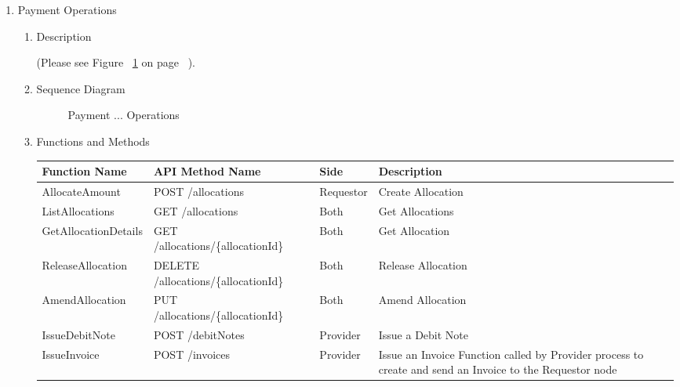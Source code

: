 

\begin{enumerate}

\item  Payment Operations

\begin{enumerate}

\item Description

(Please see Figure ~\ref{fig:PO} on page ~\pageref{fig:PO}).

\item Sequence Diagram

\begin{figure}[htbp]
    \centering
	\caption{Payment ... Operations}
    \label{fig:PO}
\end{figure}

\item Functions and Methods

\begin{table}
\footnotesize

\begin{center}
\begin{tabular}{|p{3cm}|p{7cm}|p{1.5cm}|p{4cm}|} 
\hline
\rowcolor{lightgray}	Function Name	& API Method Name				& 	Side		&	Description \\
\hline

AllocateAmount			&	POST /allocations							&	Requestor 	&	Create Allocation \\
\hline

ListAllocations			&	GET /allocations 							&	Both		&	Get Allocations	\\
\hline

GetAllocationDetails	&	GET /allocations/\{allocationId\} 			&	Both		&	Get Allocation	\\
\hline

ReleaseAllocation		&	DELETE /allocations/\{allocationId\} 		&	Both		&	Release Allocation	\\
\hline

AmendAllocation			&	PUT /allocations/\{allocationId\} 			&	Both		&	Amend Allocation	\\
\hline

IssueDebitNote			&	POST /debitNotes							& 	Provider	&	Issue a Debit Note	\\
\hline

IssueInvoice			&	POST /invoices								&	Provider	&	Issue an Invoice \newline
																							Function called by Provider process to 
																							create and send an Invoice to the Requestor node \\
\hline


\end{tabular}
\end{center}
\end{table}
\end{enumerate}
\end{enumerate}
